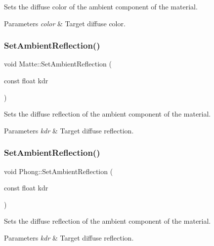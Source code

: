 Sets the diffuse color of the ambient component of the material. 
\begin{DoxyParams}{Parameters}
{\em color} & Target diffuse color. \\
\hline
\end{DoxyParams}
\hypertarget{group___materials_gad4df0e4b6f2112282b492f068faf1d72}{}\label{group___materials_gad4df0e4b6f2112282b492f068faf1d72} 
\subsubsection{\texorpdfstring{Set\+Ambient\+Reflection()}{SetAmbientReflection()}\hspace{0.1cm}{\footnotesize\ttfamily [1/2]}}
{\footnotesize\ttfamily void Matte\+::\+Set\+Ambient\+Reflection (\begin{DoxyParamCaption}\item[{const float}]{kdr }\end{DoxyParamCaption})\hspace{0.3cm}{\ttfamily [inline]}}

Sets the diffuse reflection of the ambient component of the material. 
\begin{DoxyParams}{Parameters}
{\em kdr} & Target diffuse reflection. \\
\hline
\end{DoxyParams}
\hypertarget{group___materials_ga245b163a849cf378e84ed77620172f74}{}\label{group___materials_ga245b163a849cf378e84ed77620172f74} 
\subsubsection{\texorpdfstring{Set\+Ambient\+Reflection()}{SetAmbientReflection()}\hspace{0.1cm}{\footnotesize\ttfamily [2/2]}}
{\footnotesize\ttfamily void Phong\+::\+Set\+Ambient\+Reflection (\begin{DoxyParamCaption}\item[{const float}]{kdr }\end{DoxyParamCaption})\hspace{0.3cm}{\ttfamily [inline]}}

Sets the diffuse reflection of the ambient component of the material. 
\begin{DoxyParams}{Parameters}
{\em kdr} & Target diffuse reflection. \\
\hline
\end{DoxyParams}
\hypertarget{group___materials_ga6a82d5d8fd47aeb188380c067477e396}{}\label{group___materials_ga6a82d5d8fd47aeb188380c067477e396} 
